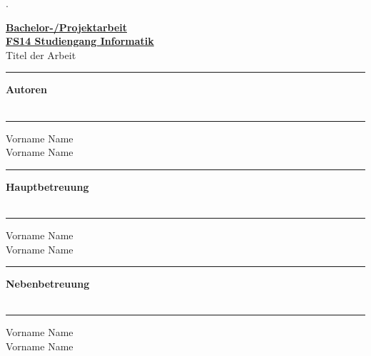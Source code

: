 \begin{titlepage}


\begin{minipage}[b]{0.117\textwidth}
\hskip 0.05cm
\end{minipage}
\begin{minipage}[b]{0.91\textwidth}
\begin{tiny}.\end{tiny}\vskip 2.8cm
	{\huge

	\textbf{\underline{Bachelor-/Projektarbeit}}\\
	\textbf{\underline{FS14 Studiengang Informatik}}\\

	Titel der Arbeit
	\vskip 0.5cm}

	\begin{minipage}[b]{0.27\textwidth}
	\hrule\vskip 0.5cm
		\textbf{Autoren}\\
		\\
	\end{minipage}
	\begin{minipage}[b]{0.03\textwidth}
	\hskip 0.5cm
	\end{minipage}
	\begin{minipage}[b]{0.7\textwidth}
	\hrule\vskip 0.5cm
		Vorname Name\\
		Vorname Name\\
	\end{minipage}

	\begin{minipage}[b]{0.27\textwidth}
	\hrule\vskip 0.5cm
		\textbf{Hauptbetreuung}\\
		\\
	\end{minipage}
	\begin{minipage}[b]{0.03\textwidth}
	\hskip 0.5cm
	\end{minipage}
	\begin{minipage}[b]{0.7\textwidth}
	\hrule\vskip 0.5cm
		Vorname Name\\
		Vorname Name\\
	\end{minipage}

	\begin{minipage}[b]{0.27\textwidth}
	\hrule\vskip 0.5cm
		\textbf{Nebenbetreuung}\\
		\\
	\end{minipage}
	\begin{minipage}[b]{0.03\textwidth}
	\hskip 0.5cm
	\end{minipage}
	\begin{minipage}[b]{0.7\textwidth}
	\hrule\vskip 0.5cm
		Vorname Name\\
		Vorname Name\\
	\end{minipage}


\end{minipage}
\end{titlepage}
